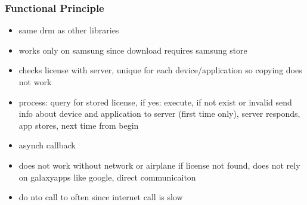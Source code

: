 \subsubsection{Functional Principle} \label{section:license-samsung-functional}
\begin{itemize}
  \item same drm as other libraries
  \item works only on samsung since download requires samsung store
  \item checks license with server, unique for each device/application so copying does not work
  \item process: query for stored license, if yes: execute, if not exist or invalid send info about device and application to server (first time only), server responds, app stores, next time from begin
  \item asynch callback
  \item does not work without network or airplane if license not found, does not rely on galaxyapps like google, direct communicaiton
  \item do nto call to often since internet call is slow
\end{itemize}
